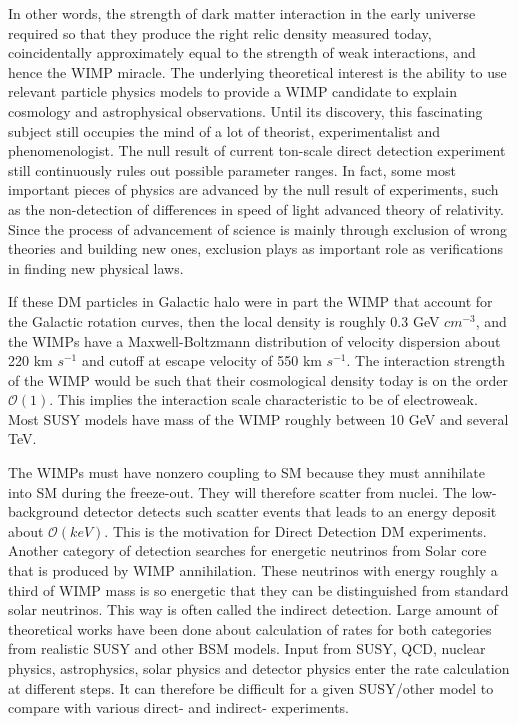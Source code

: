 \documentclass[12pt]{article}
\begin{document}
 In other words, the strength of dark matter interaction in the early universe required so that they produce the right relic density measured today, coincidentally approximately equal to the strength of weak interactions, and hence the WIMP miracle. The underlying theoretical interest is the ability to use relevant particle physics models to provide a WIMP candidate to explain cosmology and astrophysical observations. Until its discovery, this fascinating subject still occupies the mind of a lot of theorist, experimentalist and phenomenologist. The null result of current ton-scale direct detection experiment still continuously rules out possible parameter ranges. In fact, some most important pieces of physics are advanced by the null result of experiments, such as the non-detection of differences in speed of light advanced theory of relativity. Since the process of advancement of science is mainly through exclusion of wrong theories and building new ones, exclusion plays as important role as verifications in finding new physical laws. 





If these DM particles in Galactic halo were in part the WIMP that account for the Galactic rotation curves, then the local density is roughly 0.3 GeV $cm^{-3}$, and the WIMPs have a Maxwell-Boltzmann distribution of velocity dispersion about 220 km $s^{-1}$ and cutoff at escape velocity of 550 km $s^{-1}$. The interaction strength of the WIMP would be such that their cosmological density today is on the order $\mathcal O(1)$. This implies the interaction scale characteristic to be of electroweak. Most SUSY models have mass of the WIMP roughly between 10 GeV and several TeV. 

The WIMPs must have nonzero coupling to SM because they must annihilate into SM during the freeze-out. They will therefore scatter from nuclei. The low-background detector detects such scatter events that leads to an energy deposit about $\mathcal O(keV)$. This is the motivation for Direct Detection DM experiments. Another category of detection searches for energetic neutrinos from Solar core that is produced by WIMP annihilation. These neutrinos with energy roughly a third of WIMP mass is so energetic that they can be distinguished from standard solar neutrinos. This way is often called the indirect detection. Large amount of theoretical works have been done about calculation of rates for both categories from realistic SUSY and other BSM models. Input from SUSY, QCD, nuclear physics, astrophysics, solar physics and detector physics enter the rate calculation at different steps. It can therefore be difficult for a given SUSY/other model to compare with various direct- and indirect- experiments.
 
\end{document}
